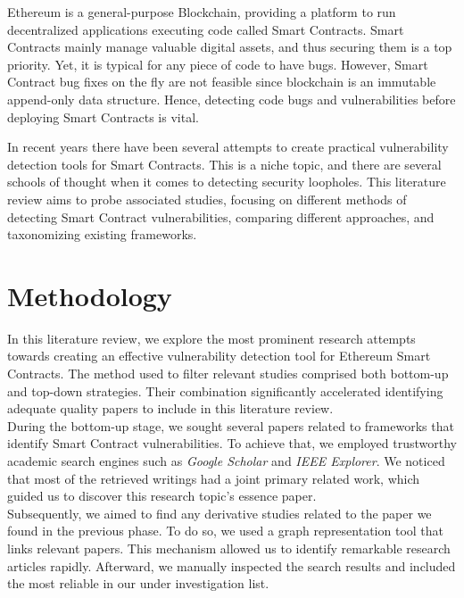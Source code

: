\documentclass[a4paper,11pt]{article}
\begin{document}
Ethereum is a general-purpose Blockchain, providing a platform to run
decentralized applications executing code called Smart Contracts. Smart Contracts
mainly manage valuable digital assets, and thus securing them is a top priority.
Yet, it is typical for any piece of code to have bugs. However, Smart Contract
bug fixes on the fly are not feasible since blockchain is an immutable
append-only data structure. Hence, detecting code bugs and vulnerabilities
before deploying Smart Contracts is vital.

In recent years there have been several attempts to create practical
vulnerability detection tools for Smart Contracts. This is a niche topic, and
there are several schools of thought when it comes to detecting security
loopholes. This literature review aims to probe associated studies, focusing on
different methods of detecting Smart Contract vulnerabilities, comparing
different approaches, and taxonomizing existing frameworks.


\section{Methodology}

In this literature review, we explore the most prominent research attempts
towards creating an effective vulnerability detection tool for Ethereum Smart
Contracts. The method used to filter relevant studies comprised both bottom-up
and top-down strategies. Their combination significantly accelerated identifying
adequate quality papers to include in this literature review.\\

During the bottom-up stage, we sought several papers related to frameworks that
identify Smart Contract vulnerabilities. To achieve that, we employed
trustworthy academic search engines such as \emph{Google Scholar} and \emph{IEEE
Explorer}. We noticed that most of the retrieved writings had a joint primary
related work, which guided us to discover this research topic's essence
paper\cite{luu2016making}. \\

Subsequently, we aimed to find any derivative studies related to the paper we
found in the previous phase. To do so, we used a graph representation
tool\cite{connectedpapers} that links relevant papers. This mechanism allowed us
to identify remarkable research articles rapidly. Afterward, we manually
inspected the search results and included the most reliable in our under
investigation list.\\
\end{document}
